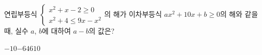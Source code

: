 \hspace*{2mm}\begin{minipage}[t]{\dimexpr\linewidth-2mm\relax}\vspace{0pt}
연립부등식 $\begin{cases} x^2+x-2\ge 0 \\ x^2+4\le 9x-x^2 \end{cases}$의 해가 이차부등식 $ax^2+10x+b\ge 0$의 해와 같을 때, 실수 $a$, $b$에 대하여 $a-b$의 값은?
\begin{choices32}{$-10$}{$-6$}{$4$}{$6$}{$10$}\end{choices32}\end{minipage}
